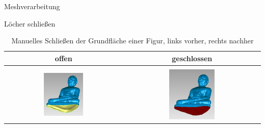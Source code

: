 \begin{frame}{Meshverarbeitung}

\begin{block}{Löcher schließen}
\begin{table}[h]
	\begin{center}
		\begin{tabular}{| c | c |}
			\hline
			offen & geschlossen \\
			\hline
			\hline
			& \\
			\includegraphics[width=0.35\textwidth]{./Images/GeomagicBudhaPictures/Budha_SfM_BottomHole_2.PNG} & \includegraphics[width=0.345\textwidth]{./Images/GeomagicBudhaPictures/Budha_SfM_BottomHoleClosed_2.PNG} \\
			\hline					  
		\end{tabular}
	\end{center}
	\caption{Manuelles Schließen der Grundfläche einer Figur, links vorher, rechts nachher}
	\label{tab:BudhaHole}
\end{table}
\end{block}

\end{frame}

